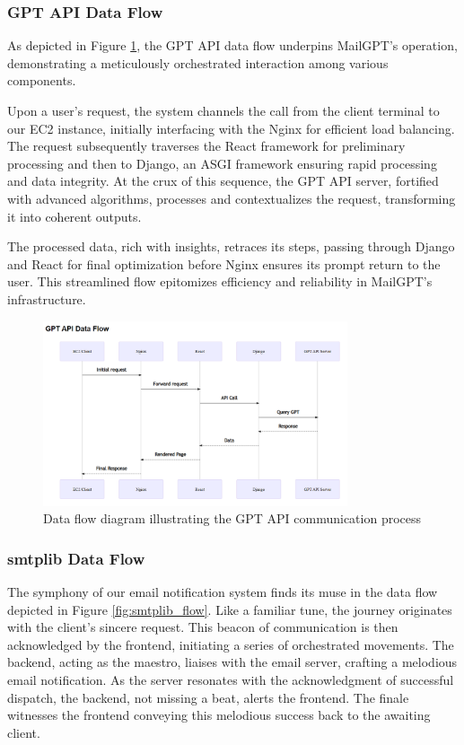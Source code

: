 \documentclass[12pt]{article}
\begin{document}
\subsubsection{GPT API Data Flow}

As depicted in Figure \ref{fig:gpt_api_flow}, the GPT API data flow underpins MailGPT's operation, demonstrating a meticulously orchestrated interaction among various components.

Upon a user's request, the system channels the call from the client terminal to our EC2 instance, initially interfacing with the Nginx for efficient load balancing. The request subsequently traverses the React framework for preliminary processing and then to Django, an ASGI framework ensuring rapid processing and data integrity. At the crux of this sequence, the GPT API server, fortified with advanced algorithms, processes and contextualizes the request, transforming it into coherent outputs.

The processed data, rich with insights, retraces its steps, passing through Django and React for final optimization before Nginx ensures its prompt return to the user. This streamlined flow epitomizes efficiency and reliability in MailGPT's infrastructure.


\begin{figure}[ht]
	\centering
	\includegraphics[width=0.8\textwidth]{gpt_api_flow.png}
	\caption{Data flow diagram illustrating the GPT API communication process}
	\label{fig:gpt_api_flow}
\end{figure}

\subsubsection{smtplib Data Flow}

The symphony of our email notification system finds its muse in the data flow depicted in Figure \ref{fig:smtplib_flow}. Like a familiar tune, the journey originates with the client's sincere request. This beacon of communication is then acknowledged by the frontend, initiating a series of orchestrated movements. The backend, acting as the maestro, liaises with the email server, crafting a melodious email notification. As the server resonates with the acknowledgment of successful dispatch, the backend, not missing a beat, alerts the frontend. The finale witnesses the frontend conveying this melodious success back to the awaiting client.
\end{document}

